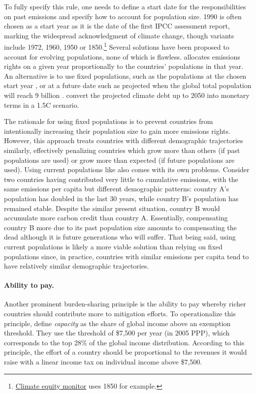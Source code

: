 \documentclass[12pt,english]{article}
\begin{document}
To fully specify this rule, one needs to define a start date for the responsibilities on past emissions and specify how to account for population size. 1990 is often chosen as a start year as it is the date of the first IPCC assessment report, marking the widespread acknowledgment of climate change, though variants include 1972, 1960, 1950 or 1850.\footnote{\href{https://climateequitymonitor.in}{Climate equity monitor} uses 1850 for example.} Several solutions have been proposed to account for evolving populations, none of which is flawless. \citet{matthews_quantifying_2015} allocates emissions rights on a given year proportionally to the countries' populations in that year. An alternative is to use fixed populations, such as the populations at the chosen start year \citep{neumayer_defence_2000}, or at a future date such as projected when the global total population will reach 9 billion \citep{raupach_sharing_2014}. \citet{fanning_compensation_2023} convert the projected climate debt up to 2050 into monetary terms in a 1.5\textdegree{}C scenario.%

The rationale for using fixed populations is to prevent countries from intentionally increasing their population size to gain more emissions rights. However, this approach treats countries with different demographic trajectories similarly, effectively penalizing countries which grow more than others (if past populations are used) or grow more than expected (if future populations are used). Using current populations like \citet{matthews_quantifying_2015} also comes with its own problems. Consider two countries having contributed very little to cumulative emissions, with the same emissions per capita but different demographic patterns: country A's population has doubled in the last 30 years, while country B's population has remained stable. Despite the similar present situation, country B would accumulate more carbon credit than country A. Essentially, compensating country B more due to its past population size amounts to compensating the dead although it is future generations who will suffer. That being said, using current populations is likely a more viable solution than relying on fixed populations since, in practice, countries with similar emissions per capita tend to have relatively similar demographic trajectories.

\paragraph{Ability to pay.} Another prominent burden-sharing principle is the ability to pay whereby richer countries should contribute more to mitigation efforts. To operationalize this principle, \citet{baer_greenhouse_2008} define \textit{capacity} as the share of global income above an exemption threshold. They use the threshold of \$7,500 per year (in 2005 PPP), which corresponds to the top 28\% of the global income distribution. According to this principle, the effort of a country should be proportional to the revenues it would raise with a linear income tax on individual income above \$7,500. 
\end{document}
